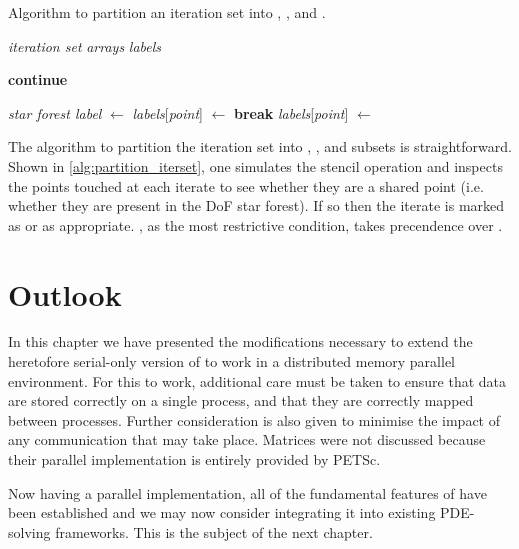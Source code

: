 \documentclass[thesis]{subfiles}
\begin{document}
\begin{algorithm}
  \caption{
    Algorithm to partition an iteration set into \coreiter{}, \rootiter{}, and \leafiter{}.
  }
  \begin{algorithmic}[1]
    \Require \textit{iteration set}
    \Require \textit{arrays} 
    \Require \textit{labels} 

       
         
          \State \textbf{continue}
        \EndIf

            \State \textit{star forest label} $\gets$ 
              \State \textit{labels}[\textit{point}] $\gets$ \leafiter{}
              \State \textbf{break} 
            \Else
              \State \textit{labels}[\textit{point}] $\gets$ \rootiter{}
            \EndIf
          \EndIf
        \EndFor
      \EndFor
    \EndFor
  \end{algorithmic}
  \label{alg:partition_iterset}
\end{algorithm}

The algorithm to partition the iteration set into \coreiter{}, \rootiter{}, and \leafiter{} subsets is straightforward.
Shown in \cref{alg:partition_iterset}, one simulates the stencil operation and inspects the points touched at each iterate to see whether they are a shared point (i.e. whether they are present in the DoF star forest).
If so then the iterate is marked as \rootiter{} or \leafiter{} as appropriate.
\leafiter{}, as the most restrictive condition, takes precendence over \rootiter{}.

\section{Outlook}

In this chapter we have presented the modifications necessary to extend the heretofore serial-only version of  to work in a distributed memory parallel environment.
For this to work, additional care must be taken to ensure that data are stored correctly on a single process, and that they are correctly mapped between processes.
Further consideration is also given to minimise the impact of any communication that may take place.
Matrices were not discussed because their parallel implementation is entirely provided by PETSc.

Now having a parallel implementation, all of the fundamental features of  have been established and we may now consider integrating it into existing PDE-solving frameworks.
This is the subject of the next chapter.
\end{document}
